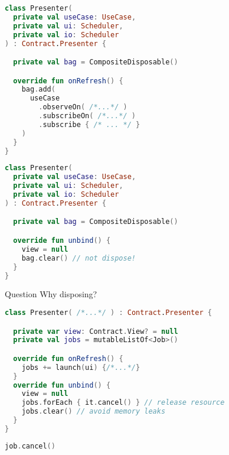 \documentclass[10pt]{beamer}
\begin{document}
\begin{frame}[fragile]
\begin{lstlisting}[language=Kotlin, basicstyle=\ttfamily]
class Presenter(
  private val useCase: UseCase,
  private val ui: Scheduler,
  private val io: Scheduler
) : Contract.Presenter {

  private val bag = CompositeDisposable()

  override fun onRefresh() {
    bag.add(
      useCase
        .observeOn( /*...*/ )
        .subscribeOn( /*...*/ )
        .subscribe { /* ... */ }
    )
  }
}
\end{lstlisting}
\end{frame}




\begin{frame}[fragile]
\begin{lstlisting}[language=Kotlin, basicstyle=\ttfamily]
class Presenter(
  private val useCase: UseCase,
  private val ui: Scheduler,
  private val io: Scheduler
) : Contract.Presenter {

  private val bag = CompositeDisposable()

  override fun unbind() {
    view = null
    bag.clear() // not dispose!
  }
}
\end{lstlisting}
\end{frame}

\begin{frame}[fragile]
	\begin{alertblock}{Question}
Why disposing?
\end{alertblock}
\end{frame}

\begin{frame}[fragile]
\begin{lstlisting}[language=Kotlin, basicstyle=\ttfamily]
class Presenter( /*...*/ ) : Contract.Presenter {

  private var view: Contract.View? = null
  private val jobs = mutableListOf<Job>()

  override fun onRefresh() {
    jobs += launch(ui) {/*...*/}
  }
  override fun unbind() {
    view = null
    jobs.forEach { it.cancel() } // release resource 
    jobs.clear() // avoid memory leaks
  }
}
\end{lstlisting}
\end{frame}



\begin{frame}[fragile]
\begin{lstlisting}[language=Kotlin, basicstyle=\ttfamily]
    job.cancel()
\end{lstlisting}
\end{frame}
\end{document}
